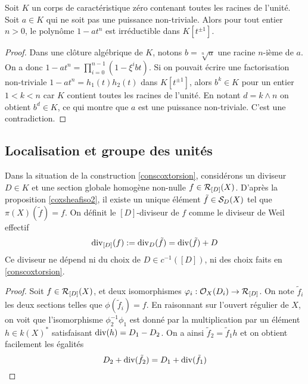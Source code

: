\begin{lem}
Soit $K$ un corps de caractéristique zéro contenant toutes les racines de l'unité. Soit $a\in K$ qui ne soit pas une puissance non-triviale. Alors pour tout entier $n> 0$, le polynôme $1-at^n$ est irréductible dans $K[t^{\pm 1}]$.
\end{lem}
\begin{proof}
Dans une clôture algébrique de $K$, notons $b=\sqrt[n]{a}$ une racine $n$-ième de $a$. On a donc $1-at^n=\prod_{i=0}^{n-1}(1-\xi^i bt)$. Si on pouvait écrire une factorisation non-triviale $1-at^n=h_1(t)h_2(t)$ dans $K[t^{\pm 1}]$, alors $b^k\in K$ pour un entier $1<k<n$ car $K$ contient toutes les racines de l'unité. En notant $d=k\wedge n$ on obtient $b^d\in K$, ce qui montre que $a$ est une puissance non-triviale. C'est une contradiction.
\end{proof}

\subsection{Localisation et groupe des unités}

\begin{cons}\label{conscoxtorsionDDiviseur}
Dans la situation de la construction \ref{conscoxtorsion}, considérons un diviseur $D\in K$ et une section globale homogène non-nulle $f\in\mathcal{R}_{[D]}(X)$. D'après la proposition \ref{coxsheafiso2}, il existe un unique élément $\tilde{f}\in\mathcal{S}_D(X)$ tel que $\pi(X)(\tilde{f})=f$. On définit le $[D]$-diviseur de $f$ comme le diviseur de Weil effectif
$$\operatorname{div}_{[D]}(f):=\operatorname{div}_D(\tilde{f})=\operatorname{div}(\tilde{f})+D$$
Ce diviseur ne dépend ni du choix de $D\in c^{-1}([D])$, ni des choix faits en \ref{conscoxtorsion}.
\end{cons}
\begin{proof}
Soit $f\in\mathcal{R}_{[D]}(X)$, et deux isomorphismes $\varphi_i:\mathcal{O}_X(D_i)\rightarrow \mathcal{R}_{[D]}$. On note $\tilde{f}_i$ les deux sections telles que $\phi(\tilde{f}_i)=f$. En raisonnant sur l'ouvert régulier de $X$, on voit que l'isomorphisme $\phi_2^{-1}\phi_1$ est donné par la multiplication par un élément $h\in k(X)^*$ satisfaisant $\operatorname{div}(h)=D_1-D_2$. On a ainsi $\tilde{f}_2=\tilde{f}_1h$ et on obtient facilement les égalités
$$D_2+\operatorname{div}(\tilde{f}_2)=D_1+\operatorname{div}(\tilde{f}_1)$$
\end{proof}


